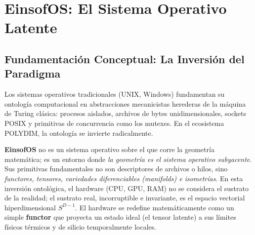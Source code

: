 \chapter{EinsofOS: El Sistema Operativo Latente}


\section{Fundamentación Conceptual: La Inversión del Paradigma}
Los sistemas operativos tradicionales (UNIX, Windows) fundamentan su ontología computacional en abstracciones mecanicistas herederas de la máquina de Turing clásica: procesos aislados, archivos de bytes unidimensionales, sockets POSIX y primitivas de concurrencia como los mutexes. En el ecosistema POLYDIM, la ontología se invierte radicalmente.

\textbf{EinsofOS} no es un sistema operativo sobre el que corre la geometría matemática; es un entorno donde \textit{la geometría es el sistema operativo subyacente}. Sus primitivas fundamentales no son descriptores de archivos o hilos, sino \textit{functores, tensores, variedades diferenciables (manifolds) e isometrías}. En esta inversión ontológica, el hardware (CPU, GPU, RAM) no se considera el sustrato de la realidad; el sustrato real, incorruptible e invariante, es el espacio vectorial hiperdimensional $S^{D-1}$. El hardware se redefine matemáticamente como un simple \textbf{functor} que proyecta un estado ideal (el tensor latente) a sus límites físicos térmicos y de silicio temporalmente locales. 

